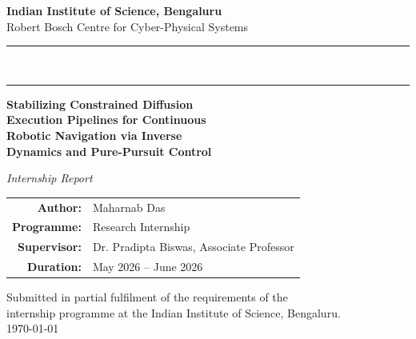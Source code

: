 \documentclass[12pt, a4paper, oneside]{report}
\theoremstyle{definition}
\begin{document}
\begin{titlepage}
  \centering
  \vspace*{0.8cm}

  {\Large\bfseries Indian Institute of Science, Bengaluru}\\[0.25cm]
  {\normalsize Robert Bosch Centre for Cyber-Physical Systems}\\[0.1cm]
  \rule{\linewidth}{0.6pt}\\[-0.1cm]
  \rule{\linewidth}{0.15pt}

  \vspace{1.6cm}

  {\LARGE\bfseries\color{iiscblue}
   Stabilizing Constrained Diffusion\\[0.35cm]
   Execution Pipelines for Continuous\\[0.35cm]
   Robotic Navigation via Inverse\\[0.35cm]
   Dynamics and Pure-Pursuit Control}

  \vspace{1.6cm}
  {\large\itshape Internship Report}\\[0.8cm]

  \begin{tabular}{r@{\hskip 0.5em}l}
    \textbf{Author:}     & Maharnab Das                                \\[5pt]
    \textbf{Programme:}  & Research Internship                         \\[5pt]
    \textbf{Supervisor:} & Dr. Pradipta Biswas, Associate Professor    \\[5pt]
    \textbf{Duration:}   & May 2026 -- June 2026                       \\[5pt]
  \end{tabular}

  \vfill
  {\small
   Submitted in partial fulfilment of the requirements of the\\
   internship programme at the Indian Institute of Science, Bengaluru.}\\[0.6cm]
  {\small\today}
\end{titlepage}
\end{document}
